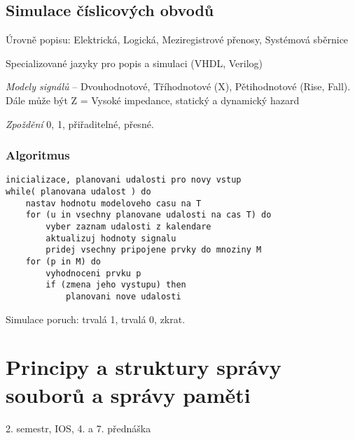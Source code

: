 \documentclass[a4wide]{report}
\begin{document}
\section{Simulace číslicových obvodů}

Úrovně popisu: Elektrická, Logická, Meziregistrové přenosy, Systémová sběrnice

Specializované jazyky pro popis a simulaci (VHDL, Verilog)

\emph{Modely signálů} -- Dvouhodnotové, Tříhodnotové (X), Pětihodnotové (Rise, Fall). Dále může být Z = Vysoké impedance, statický a dynamický hazard

\emph{Zpoždění} 0, 1, přiřaditelné, přesné.

\subsection{Algoritmus}

\begin{lstlisting}
inicializace, planovani udalosti pro novy vstup
while( planovana udalost ) do
	nastav hodnotu modeloveho casu na T
	for (u in vsechny planovane udalosti na cas T) do
		vyber zaznam udalosti z kalendare
		aktualizuj hodnoty signalu
		pridej vsechny pripojene prvky do mnoziny M
	for (p in M) do
		vyhodnoceni prvku p
		if (zmena jeho vystupu) then
			planovani nove udalosti
\end{lstlisting}

Simulace poruch: trvalá 1, trvalá 0, zkrat.


























\setcounter{chapter}{33}
\chapter{Principy a struktury správy souborů a správy paměti} \label{cha:34}

2. semestr, IOS, 4. a 7. přednáška
\end{document}
